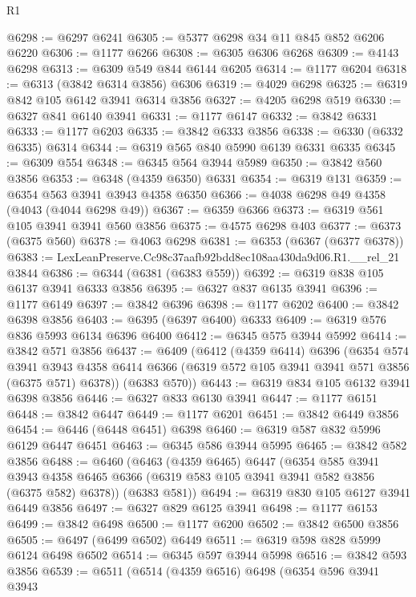 \begin{lexlean}{R1}
\begin{coremodule}
@6298 := @6297 @6241
@6305 := @5377 @6298 @34 @11 @845 @852 @6206 @6220
@6306 := @1177 @6266
@6308 := @6305 @6306 @6268
@6309 := @4143 @6298
@6313 := @6309 @549 @844 @6144 @6205
@6314 := @1177 @6204
@6318 := @6313 (@3842 @6314 @3856) @6306
@6319 := @4029 @6298
@6325 := @6319 @842 @105 @6142 @3941 @6314 @3856
@6327 := @4205 @6298 @519
@6330 := @6327 @841 @6140 @3941
@6331 := @1177 @6147
@6332 := @3842 @6331
@6333 := @1177 @6203
@6335 := @3842 @6333 @3856
@6338 := @6330 (@6332 @6335) @6314
@6344 := @6319 @565 @840 @5990 @6139 @6331 @6335
@6345 := @6309 @554
@6348 := @6345 @564 @3944 @5989
@6350 := @3842 @560 @3856
@6353 := @6348 (@4359 @6350) @6331
@6354 := @6319 @131
@6359 := @6354 @563 @3941 @3943 @4358 @6350
@6366 := @4038 @6298 @49 @4358 (@4043 (@4044 @6298 @49))
@6367 := @6359 @6366
@6373 := @6319 @561 @105 @3941 @3941 @560 @3856
@6375 := @4575 @6298 @403
@6377 := @6373 (@6375 @560)
@6378 := @4063 @6298
@6381 := @6353 (@6367 (@6377 @6378))
@6383 := LexLeanPreserve.Cc98c37aafb92bdd8ec108aa430da9d06.R1.__rel_21 @3844
@6386 := @6344 (@6381 (@6383 @559))
@6392 := @6319 @838 @105 @6137 @3941 @6333 @3856
@6395 := @6327 @837 @6135 @3941
@6396 := @1177 @6149
@6397 := @3842 @6396
@6398 := @1177 @6202
@6400 := @3842 @6398 @3856
@6403 := @6395 (@6397 @6400) @6333
@6409 := @6319 @576 @836 @5993 @6134 @6396 @6400
@6412 := @6345 @575 @3944 @5992
@6414 := @3842 @571 @3856
@6437 := @6409
    (@6412
      (@4359 @6414)
      @6396
      (@6354
        @574
        @3941
        @3943
        @4358
        @6414
        @6366
        (@6319 @572 @105 @3941 @3941 @571 @3856 (@6375 @571) @6378))
      (@6383 @570))
@6443 := @6319 @834 @105 @6132 @3941 @6398 @3856
@6446 := @6327 @833 @6130 @3941
@6447 := @1177 @6151
@6448 := @3842 @6447
@6449 := @1177 @6201
@6451 := @3842 @6449 @3856
@6454 := @6446 (@6448 @6451) @6398
@6460 := @6319 @587 @832 @5996 @6129 @6447 @6451
@6463 := @6345 @586 @3944 @5995
@6465 := @3842 @582 @3856
@6488 := @6460
    (@6463
      (@4359 @6465)
      @6447
      (@6354
        @585
        @3941
        @3943
        @4358
        @6465
        @6366
        (@6319 @583 @105 @3941 @3941 @582 @3856 (@6375 @582) @6378))
      (@6383 @581))
@6494 := @6319 @830 @105 @6127 @3941 @6449 @3856
@6497 := @6327 @829 @6125 @3941
@6498 := @1177 @6153
@6499 := @3842 @6498
@6500 := @1177 @6200
@6502 := @3842 @6500 @3856
@6505 := @6497 (@6499 @6502) @6449
@6511 := @6319 @598 @828 @5999 @6124 @6498 @6502
@6514 := @6345 @597 @3944 @5998
@6516 := @3842 @593 @3856
@6539 := @6511
    (@6514
      (@4359 @6516)
      @6498
      (@6354
        @596
        @3941
        @3943

\end{coremodule}
\end{lexlean}
